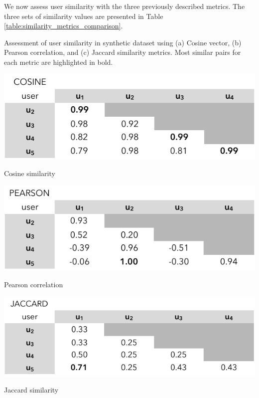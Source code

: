 We now assess user similarity with the three previously described metrics. The three sets of similarity values are presented in Table \ref{table:similarity_metrics_comparison}. 
\begin{table}[ht!]
\caption[Assessment of user similarity with different measures of simmilarity]{Assessment of user similarity in synthetic dataset using (a) Cosine vector, (b) Pearson correlation, and (c) Jaccard similarity metrics. Most similar pairs for each metric are highlighted in bold.}
\label{table:similarity_metrics_comparison}
	\centering
	\begin{subtable}[b]{0.55\textwidth}
		\includegraphics[width=\textwidth]{similarity_cosine.pdf}
        \caption{Cosine similarity}
        \label{table:cosine_similarity}
	\end{subtable}
    \vspace{10pt}

	\begin{subtable}[b]{0.55\textwidth}
		\includegraphics[width=\textwidth]{similarity_pearson.pdf}
        \caption{Pearson correlation}
        \label{table:pearson_similarity}
	\end{subtable}
    \vspace{10pt}
    
	\begin{subtable}[b]{0.55\textwidth}
		\includegraphics[width=\textwidth]{similarity_jaccard.pdf}
        \caption{Jaccard similarity}
        \label{table:jaccard_similarity}
	\end{subtable}
\end{table}
